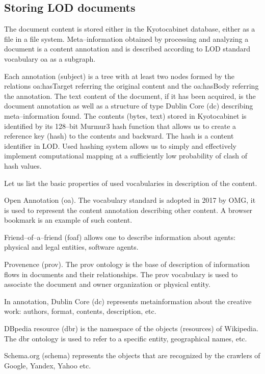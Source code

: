 \documentclass[conference,a4paper]{IEEEtran}
\begin{document}
\subsection{Storing LOD documents}

The document content is stored either in the Kyotocabinet database,
either as a file in a file system. Meta--information obtained by
processing and analyzing a document is a content annotation and is
described according to LOD standard vocabulary oa as a subgraph.

Each annotation (subject) is a tree with at least two nodes formed by
the relations oa:hasTarget referring the original content and the
oa:hasBody referring the annotation. The text content of the document,
if it has been acquired, is the document annotation as well as a
structure of type Dublin Core (dc) describing meta--information found.
The contents (bytes, text) stored in Kyotocabinet is identified by its
128--bit Murmur3 hash function that allows us to create a reference key
(hash) to the contents and backward. The hash is a content identifier in
LOD. Used hashing system allows us to simply and effectively implement
computational mapping at a sufficiently low probability of clash of hash
values.

Let us list the basic properties of used vocabularies in description of
the content.

Open Annotation (oa). The vocabulary standard is adopted in 2017 by OMG, it is
used to represent the content annotation describing other content. A
browser bookmark is an example of such content.

Friend--of--a--friend (foaf) allows one to describe information about
agents: physical and legal entities, software agents.

Provenence (prov). The prov ontology is the base of description of
information flows in documents and their relationships. The prov
vocabulary is used to associate the document and owner organization or
physical entity.

In annotation, Dublin Core (dc) represents metainformation about the
creative work: authors, format, contents, description, etc.

DBpedia resource (dbr) is the namespace of the objects (resources) of
Wikipedia. The dbr ontology is used to refer to a specific entity,
geographical names, etc.

Schema.org (schema) represents the objects that are recognized by the
crawlers of Google, Yandex, Yahoo etc.
\end{document}
